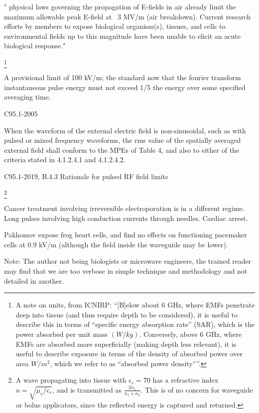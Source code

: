 \documentclass[paper.tex]{subfiles}
\begin{document}
\begin{multicols}{1}
" physical laws governing the propagation of E-fields in air already limit the maximum allowable peak E-field at ~3 MV/m (air breakdown). Current research efforts by members to expose biological organism(s), tissues, and cells to environmental
fields up to this magnitude have been unable to elicit an acute biological response."


\footnote{A note on units, from ICNIRP: ``{[B]elow about 6 GHz, where EMFs penetrate deep into tissue (and thus require depth to be considered), it is useful to describe this in terms of “specific energy absorption rate” (SAR), which is the power absorbed per unit mass $(W/kg)$. Conversely, above 6 GHz, where EMFs are absorbed more superficially (making depth less relevant), it is useful to describe exposure in terms of the density of absorbed power over area $W/m^2$, which we refer to as “absorbed power density”}''. }

A provisional limit of 100 kV/m; the standard now that the fourier transform instantaneous pulse energy must not exceed 1/5 the energy over some specified averaging time.

C95.1-2005


When the waveform of the external electric field is non-sinusoidal, such as with pulsed or mixed frequency
waveforms, the rms value of the spatially averaged external field shall conform to the MPEs of Table 4, and
also to either of the criteria stated in 4.1.2.4.1 and 4.1.2.4.2.




C95.1-2019, B.4.3 Rationale for pulsed RF field limits



\footnote{A wave propagating into tissue with $\epsilon_r=70$ has a refractive index $n=\sqrt{\mu_r/\epsilon_r}$, and is transmitted as $\frac{2 n_1}{n_1 + n_2}$. This is of no concern for waveguide or bolus applicators, since the reflected energy is captured and returned.}






Cancer treatment involving irreversible electroporation is in a different regime. Long pulses involving high conduction currents through needles. Cardiac arrest.



Pakhomov \cite{Comparative} expose frog heart cells, and find no effects on functioning pacemaker cells at 0.9 kV/m (although the field inside the waveguide may be lower). 


Note: The author not being biologists or microwave engineers, the trained reader may find that we are too verbose in simple technique and methodology and not detailed in another.



\end{multicols}
\end{document}
